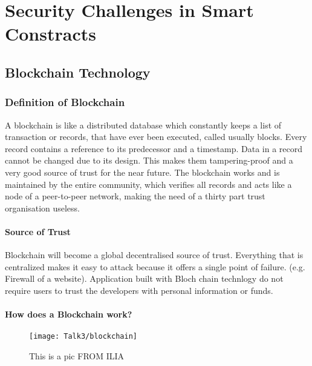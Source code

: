 
\chapter{Security Challenges in Smart Constracts}


\newpage

\minitoc %

\newpage


\section{Blockchain Technology}
\subsection{Definition of Blockchain}
A blockchain is like a distributed database which constantly keeps a list of transaction or records, that have ever been executed, called usually blocks. Every record contains a reference to its predecessor and a timestamp. \cite{wikipedia1}
Data in a record cannot be changed due to its design. This makes them tampering-proof and a very good source of trust for the near future. \cite{blockchain3}
The blockchain works and is maintained by the entire community, which verifies all records and acts like a node of a peer-to-peer network, making the need of a thirty part trust organisation useless. \cite{blockchain0}
\subsubsection{Source of Trust}
Blockchain will become a global decentralised source of trust.
Everything that is centralized makes it easy to attack because it offers a single point of failure. 
(e.g. Firewall of a website). 
Application built with Bloch chain technlogy do not require  users to trust the developers with personal information or funds. 
\subsubsection{How does a Blockchain work?}
           \begin{figure}[ht]
         \begin{center}
         \texttt{[image: Talk3/blockchain]}
         \end{center}
         \caption{This is a pic FROM ILIA}
         \label{label}
       \end{figure}
   
